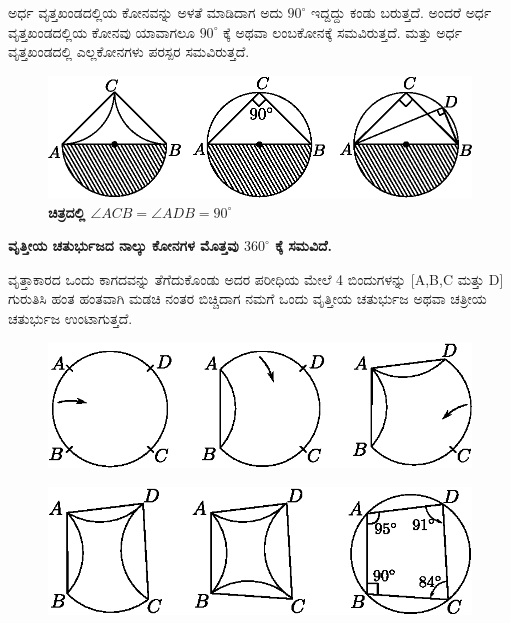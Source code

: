 \begin{itemize}
 ಅರ್ಧ  ವೃತ್ತಖಂಡದಲ್ಲಿಯ ಕೋನವನ್ನು ಅಳತೆ ಮಾಡಿದಾಗ ಅದು $90^\circ$ ಇದ್ದದ್ದು ಕಂಡು ಬರುತ್ತದೆ. ಅಂದರೆ ಅರ್ಧ ವೃತ್ತಖಂಡದಲ್ಲಿಯ ಕೋನವು ಯಾವಾಗಲೂ $90^\circ$ ಕ್ಕೆ ಅಥವಾ ಲಂಬಕೋನಕ್ಕೆ ಸಮವಿರುತ್ತದೆ. ಮತ್ತು ಅರ್ಧ ವೃತ್ತಖಂಡದಲ್ಲಿ ಎಲ್ಲಕೋನಗಳು ಪರಸ್ಪರ ಸಮವಿರುತ್ತದೆ. 
   \begin{figure}[H]
\centering
\includegraphics[scale=.98]{src/figure/chap1/fig1-31b.eps}\\
\textbf{ಚಿತ್ರದಲ್ಲಿ \quad $\angle ACB = \angle ADB = 90^\circ$}
\end{figure}
  \end{itemize}
   
   \noindent
   \textbf{ವೃತ್ತೀಯ ಚತುರ್ಭುಜದ ನಾಲ್ಕು ಕೋನಗಳ ಮೊತ್ತವು $360^\circ$ ಕ್ಕೆ ಸಮವಿದೆ.}
   
   ವೃತ್ತಾಕಾರದ ಒಂದು ಕಾಗದವನ್ನು ತೆಗೆದುಕೊಂಡು ಅದರ ಪರೀಧಿಯ ಮೇಲೆ 4 ಬಿಂದುಗಳನ್ನು [A,B,C ಮತ್ತು  D] ಗುರುತಿಸಿ ಹಂತ ಹಂತವಾಗಿ ಮಡಚಿ ನಂತರ ಬಿಚ್ಚಿದಾಗ ನಮಗೆ ಒಂದು ವೃತ್ತೀಯ ಚತುರ್ಭುಜ ಅಥವಾ ಚತ್ರೀಯ ಚತುರ್ಭುಜ ಉಂಟಾಗುತ್ತದೆ. 
      \begin{figure}[H]
\centering
\includegraphics[scale=.98]{src/figure/chap1/fig1-32a.eps}
\end{figure}
      \begin{figure}[H]
\centering
\includegraphics[scale=.98]{src/figure/chap1/fig1-32b.eps}
\end{figure}
 
